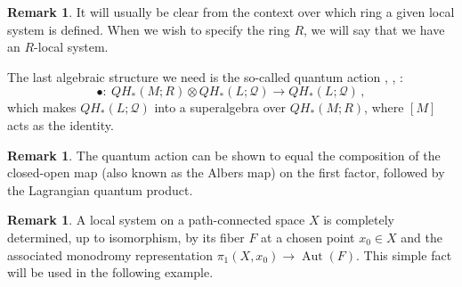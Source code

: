 \documentclass[11pt%
]{article}
\theoremstyle{definition}
\newtheorem{rem}[thm]{Remark}
\newcommand{\cQ}{{\mathcal{Q}}}
\newcommand{\fc}{{:\ }}
\DeclareMathOperator{\Aut}{Aut}
\DeclareMathOperator{\0}{\operatorname{\mathbf{0}}}
\begin{document}
\begin{rem}
  It will usually be clear from the context over which ring a given local system is defined. When we wish to specify the ring $R$, we will say that we have an $R$-local system.
\end{rem}

The last algebraic structure we need is the so-called quantum action \cite{biran2007quantum}, \cite{Biran_Cornea_Lag_Top_Enumerative_Geom}, \cite{Zapolsky_Orientations}:
$$\bullet\fc QH_*(M;R)\otimes QH_*(L;\cQ) \to QH_*(L;\cQ)\,,$$
which makes $QH_*(L;\cQ)$ into a superalgebra over $QH_*(M;R)$, where $[M]$ acts as the identity.
\begin{rem}
  The quantum action can be shown to equal the composition of the closed-open map (also known as the Albers map) on the first factor, followed by the Lagrangian quantum product.
\end{rem}

\begin{rem}
  A local system on a path-connected space $X$ is completely determined, up to isomorphism, by its fiber $F$ at a chosen point $x_0 \in X$ and the associated monodromy representation $\pi_1(X,x_0) \to\Aut(F)$. This simple fact will be used in the following example.
\end{rem}
\end{document}
